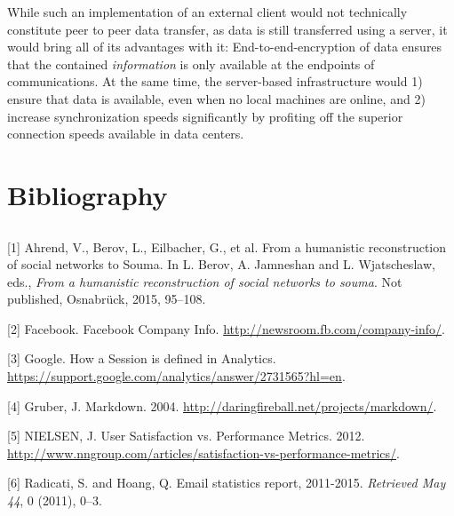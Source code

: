 While such an implementation of an external client would not technically
constitute peer to peer data transfer, as data is still transferred
using a server, it would bring all of its advantages with it:
End-to-end-encryption of data ensures that the contained
\emph{information} is only available at the endpoints of communications.
At the same time, the server-based infrastructure would 1) ensure that
data is available, even when no local machines are online, and 2)
increase synchronization speeds significantly by profiting off the
superior connection speeds available in data centers.

\part*{Bibliography} \manualmark
\markboth{\spacedlowsmallcaps{\bibname}}{\spacedlowsmallcaps{\bibname}}

\chapter*{\bibname}

{[}1{]} Ahrend, V., Berov, L., Eilbacher, G., et al. From a humanistic
reconstruction of social networks to Souma. In L. Berov, A. Jamneshan
and L. Wjatscheslaw, eds., \emph{From a humanistic reconstruction of
social networks to souma}. Not published, Osnabrück, 2015, 95--108.

{[}2{]} Facebook. Facebook Company Info.
\url{http://newsroom.fb.com/company-info/}.

{[}3{]} Google. How a Session is defined in Analytics.
\url{https://support.google.com/analytics/answer/2731565?hl=en}.

{[}4{]} Gruber, J. Markdown. 2004.
\url{http://daringfireball.net/projects/markdown/}.

{[}5{]} NIELSEN, J. User Satisfaction vs. Performance Metrics. 2012.
\url{http://www.nngroup.com/articles/satisfaction-vs-performance-metrics/}.

{[}6{]} Radicati, S. and Hoang, Q. Email statistics report, 2011-2015.
\emph{Retrieved May 44}, 0 (2011), 0--3.


